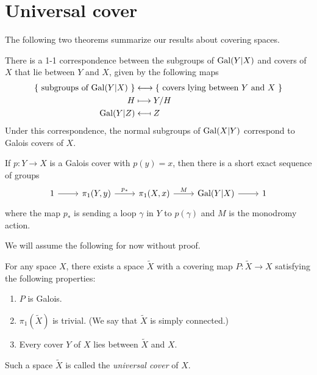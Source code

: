 \section{Universal cover}

The following two theorems summarize our results about covering spaces.

\begin{theorem}
  There is a 1-1 correspondence between the subgroups of $\operatorname{Gal}(Y|X)$ and covers of $X$ that lie between $Y$ and $X$, given by the following maps
  \begin{align*}
    \{\mbox{ subgroups of $\operatorname{Gal}(Y|X)$ } \} &\longleftrightarrow  \{\mbox{ covers lying between $Y$ and $X$ } \}\\
    H &\longmapsto Y/H \\
    \operatorname{Gal}(Y|Z) & \longmapsfrom Z
  \end{align*}
  Under this correspondence, the normal subgroups of $\operatorname{Gal}(X|Y)$ correspond to Galois covers of $X$.
\end{theorem}

\begin{theorem}
  \label{theorem:fundamentalGroupQuotient2}
  If $p:Y \rightarrow X$ is a Galois cover with $p(y) = x$, then there is a short exact sequence of groups
  \begin{equation*}
    \begin{tikzcd}
      1 \ar[r] & \pi_1(Y,y) \ar[r, "p_*"] & \pi_1(X,x) \ar[r,"M"] &  \Gal(Y|X) \ar[r] & 1
    \end{tikzcd}
  \end{equation*}
  where the map $p_*$ is sending a loop $\gamma$ in $Y$ to $p(\gamma)$ and $M$ is the monodromy action.
\end{theorem}

We will assume the following for now without proof.
\begin{theorem}
  For any space $X$, there exists a space $\widetilde{X}$ with a covering map $P:\widetilde{X} \rightarrow X$ satisfying the following properties:
  \begin{enumerate}
    \item $P$ is Galois.
    \item $\pi_1(\widetilde{X})$ is trivial. (We say that $\widetilde{X}$ is simply connected.)
    \item Every cover $Y$ of $X$ lies between $\widetilde{X}$ and $X$.
  \end{enumerate}
  Such a space $\widetilde{X}$ is called the \emph{universal cover} of $X$.
\end{theorem}

